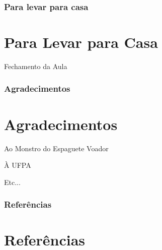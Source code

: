 \documentclass[11pt]{beamer}
\begin{document}
\begin{frame}
\frametitle{Para levar para casa}
\section{Para Levar para Casa}

Fechamento da Aula

\end{frame}





\begin{frame}
\frametitle{Agradecimentos}
\section{Agradecimentos}

Ao Monstro do Espaguete Voador

À UFPA

Etc...

\end{frame}

\begin{frame}[allowframebreaks]
\frametitle{Referências}
       \section{Referências}



\end{frame}
\end{document}
